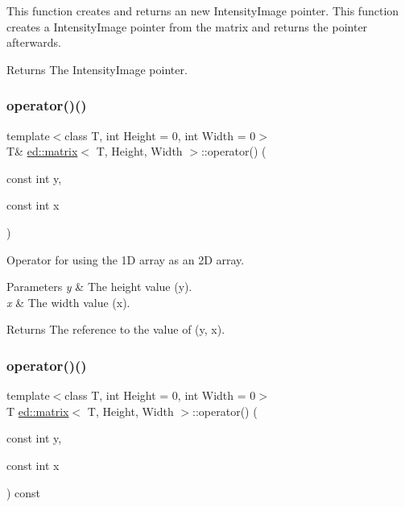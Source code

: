 This function creates and returns an new Intensity\+Image pointer. This function creates a Intensity\+Image pointer from the matrix and returns the pointer afterwards. 

\begin{DoxyReturn}{Returns}
The Intensity\+Image pointer. 
\end{DoxyReturn}
\mbox{\label{classed_1_1matrix_a958041dd0f380db0f0b60f85b736b020}} 
\subsubsection{\texorpdfstring{operator()()}{operator()()}\hspace{0.1cm}{\footnotesize\ttfamily [1/4]}}
{\footnotesize\ttfamily template$<$class T, int Height = 0, int Width = 0$>$ \\
T\& \mbox{\hyperlink{classed_1_1matrix}{ed\+::matrix}}$<$ T, Height, Width $>$\+::operator() (\begin{DoxyParamCaption}\item[{const int}]{y,  }\item[{const int}]{x }\end{DoxyParamCaption})\hspace{0.3cm}{\ttfamily [inline]}}

Operator for using the 1D array as an 2D array.


\begin{DoxyParams}{Parameters}
{\em y} & The height value (y). \\
\hline
{\em x} & The width value (x).\\
\hline
\end{DoxyParams}
\begin{DoxyReturn}{Returns}
The reference to the value of (y, x). 
\end{DoxyReturn}
\mbox{\label{classed_1_1matrix_a6c184e083e3849cb0804915300d68cad}} 
\subsubsection{\texorpdfstring{operator()()}{operator()()}\hspace{0.1cm}{\footnotesize\ttfamily [2/4]}}
{\footnotesize\ttfamily template$<$class T, int Height = 0, int Width = 0$>$ \\
T \mbox{\hyperlink{classed_1_1matrix}{ed\+::matrix}}$<$ T, Height, Width $>$\+::operator() (\begin{DoxyParamCaption}\item[{const int}]{y,  }\item[{const int}]{x }\end{DoxyParamCaption}) const\hspace{0.3cm}{\ttfamily [inline]}}

